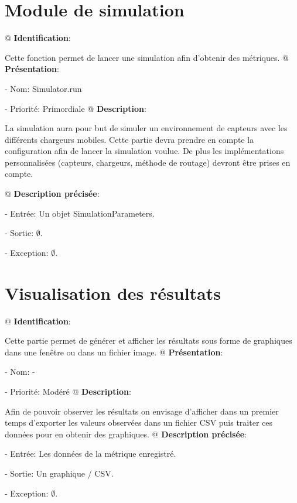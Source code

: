 \documentclass[final]{polytech/polytech}
\begin{document}
	\section{Module de simulation}
		\begin{easylist}[enumerate]
			@ \textbf{Identification}:
			
			Cette fonction permet de lancer une simulation afin d'obtenir des métriques.
			@ \textbf{Présentation}:
			
			- Nom: Simulator.run
			
			- Priorité: Primordiale
			@ \textbf{Description}:
			
			La simulation aura pour but de simuler un environnement de capteurs avec les différents chargeurs mobiles.
			Cette partie devra prendre en compte la configuration afin de lancer la simulation voulue.
			De plus les implémentations personnalisées (capteurs, chargeurs, méthode de routage) devront être prises en compte.
			
			@ \textbf{Description précisée}:
			
			- Entrée: Un objet SimulationParameters.
			
			- Sortie: $\emptyset$.
			
			- Exception: $\emptyset$.
		\end{easylist}

	\section{Visualisation des résultats}
		\begin{easylist}[enumerate]
			@ \textbf{Identification}:
			
			Cette partie permet de générer et afficher les résultats sous forme de graphiques dans une fenêtre ou dans un fichier image.
			@ \textbf{Présentation}:
			
			- Nom: -
			
			- Priorité: Modéré
			@ \textbf{Description}:
			
			Afin de pouvoir observer les résultats on envisage d'afficher dans un premier temps d'exporter les valeurs observées dans un fichier CSV puis traiter ces données pour en obtenir des graphiques.
			@ \textbf{Description précisée}:
			
			- Entrée: Les données de la métrique enregistré.
			
			- Sortie: Un graphique / CSV.
			
			- Exception: $\emptyset$.
		\end{easylist}
		
\end{document}
